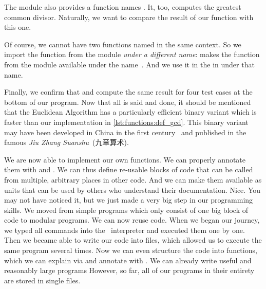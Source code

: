 The  module also provides a function names .
It, too, computes the greatest common divisor.
Naturally, we want to compare the result of our function with this one.
%
\begin{sloppypar}%
Of course, we cannot have two functions named  in the same context.
So we import the function from the  module \emph{under a different name}:
 makes the  function from the module  available under the name~.
And we use it in the  in  under that name.%
\end{sloppypar}%
%
Finally, we confirm that  and  compute the same result for four test cases at the bottom of our program.
Now that all is said and done, it should be mentioned that the Euclidean Algorithm has a particularly efficient binary variant which is faster than our implementation in \cref{lst:functions:def_gcd}.
This binary variant may have been developed in China in the first century~ and published in the famous \emph{Jiu Zhang Suanshu}~(九章算术).

We are now able to implement our own functions.
We can properly annotate them with  and .
We can thus define re-usable blocks of code that can be called from multiple, arbitrary places in other code.
And we can make them available as units that can be used by others who understand their documentation.
Nice.%
%
\FloatBarrier%
\endhsection%
%
%
\label{sec:functionsInModules}%
%
%
%
%
%
You may not have noticed it, but we just made a very big step in our programming skills.
We moved from simple programs which only consist of one big block of code to modular programs.
We can now reuse code.
When we began our journey, we typed all commands into the \python\ interpreter and executed them one by one.
Then we became able to write our code into files, which allowed us to execute the same program several times.
Now we can even structure the code into functions, which we can explain via  and annotate with .
We can already write useful and reasonably large programs
However, so far, all of our programs in their entirety are stored in single files.

